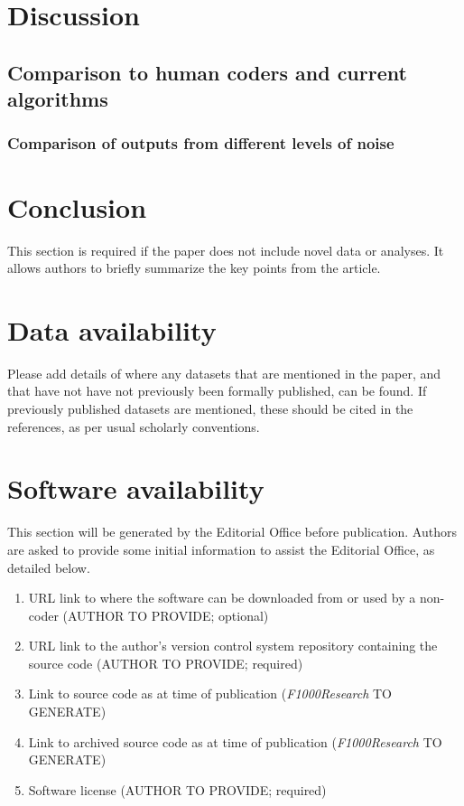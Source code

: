 \documentclass[10pt,a4paper]{extarticle}
\begin{document}




\section*{Discussion}

\subsection*{Comparison to human coders and current algorithms}


\subsubsection*{Comparison of outputs from different levels of noise}


\section*{Conclusion} %
This section is required if the paper does not include novel data or analyses.  It allows authors to briefly summarize the key points from the article.

\section*{Data availability} %
Please add details of where any datasets that are mentioned in the paper, and that have not have not previously been formally published, can be found.  If previously published datasets are mentioned, these should be cited in the references, as per usual scholarly conventions.


\section*{Software availability}
This section will be generated by the Editorial Office before publication. Authors are asked to provide some initial information to assist the Editorial Office, as detailed below.
\begin{enumerate}
\item URL link to where the software can be downloaded from or used by a non-coder (AUTHOR TO PROVIDE; optional)
\item URL link to the author's version control system repository containing the source code (AUTHOR TO PROVIDE; required)
\item Link to source code as at time of publication ({\textit{F1000Research}} TO GENERATE)
\item Link to archived source code as at time of publication ({\textit{F1000Research}} TO GENERATE)
\item Software license (AUTHOR TO PROVIDE; required)
\end{enumerate}
\end{document}
